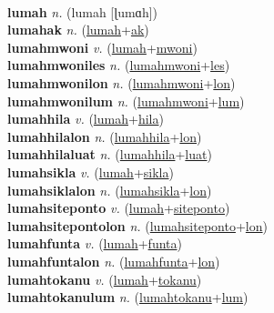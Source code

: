  \label{lum} \\
\textbf{lumah} \textit{n.} ({\javanese{}lumah} [ɭumɑh])
 \label{lumah} \\
\textbf{lumahak} \textit{n.} (\hyperref[lumah]{lumah}+\hyperref[ak]{ak})
 \label{lumahak} \\
\textbf{lumahmwoni} \textit{v.} (\hyperref[lumah]{lumah}+\hyperref[mwoni]{mwoni})
 \label{lumahmwoni} \\
\textbf{lumahmwoniles} \textit{n.} (\hyperref[lumahmwoni]{lumahmwoni}+\hyperref[les]{les})
 \label{lumahmwoniles} \\
\textbf{lumahmwonilon} \textit{n.} (\hyperref[lumahmwoni]{lumahmwoni}+\hyperref[lon]{lon})
 \label{lumahmwonilon} \\
\textbf{lumahmwonilum} \textit{n.} (\hyperref[lumahmwoni]{lumahmwoni}+\hyperref[lum]{lum})
 \label{lumahmwonilum} \\
\textbf{lumahhila} \textit{v.} (\hyperref[lumah]{lumah}+\hyperref[hila]{hila})
 \label{lumahhila} \\
\textbf{lumahhilalon} \textit{n.} (\hyperref[lumahhila]{lumahhila}+\hyperref[lon]{lon})
 \label{lumahhilalon} \\
\textbf{lumahhilaluat} \textit{n.} (\hyperref[lumahhila]{lumahhila}+\hyperref[luat]{luat})
 \label{lumahhilaluat} \\
\textbf{lumahsikla} \textit{v.} (\hyperref[lumah]{lumah}+\hyperref[sikla]{sikla})
 \label{lumahsikla} \\
\textbf{lumahsiklalon} \textit{n.} (\hyperref[lumahsikla]{lumahsikla}+\hyperref[lon]{lon})
 \label{lumahsiklalon} \\
\textbf{lumahsiteponto} \textit{v.} (\hyperref[lumah]{lumah}+\hyperref[siteponto]{siteponto})
 \label{lumahsiteponto} \\
\textbf{lumahsitepontolon} \textit{n.} (\hyperref[lumahsiteponto]{lumahsiteponto}+\hyperref[lon]{lon})
 \label{lumahsitepontolon} \\
\textbf{lumahfunta} \textit{v.} (\hyperref[lumah]{lumah}+\hyperref[funta]{funta})
 \label{lumahfunta} \\
\textbf{lumahfuntalon} \textit{n.} (\hyperref[lumahfunta]{lumahfunta}+\hyperref[lon]{lon})
 \label{lumahfuntalon} \\
\textbf{lumahtokanu} \textit{v.} (\hyperref[lumah]{lumah}+\hyperref[tokanu]{tokanu})
 \label{lumahtokanu} \\
\textbf{lumahtokanulum} \textit{n.} (\hyperref[lumahtokanu]{lumahtokanu}+\hyperref[lum]{lum})
 \label{lumahtokanulum} \\
